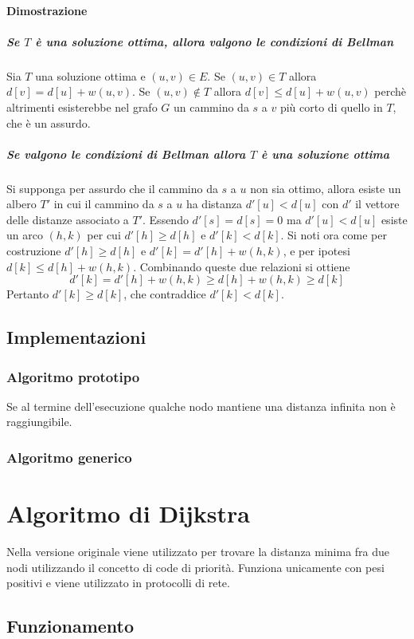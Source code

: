 	\paragraph{Dimostrazione}
	\subparagraph{Se $T$ \`e una soluzione ottima, allora valgono le condizioni di Bellman} Sia $T$ una soluzione ottima e $(u, v)\in E$. Se $(u, v)\in T$ allora $d[v]=d[u]+w(u, v)$. Se $(u,
		v)\not\in T$ allora $d[v]\le d[u]+w(u, v)$ perch\`e altrimenti esisterebbe nel grafo $G$ un cammino
	da $s$ a $v$ pi\`u corto di quello in $T$, che \`e un assurdo.
	\subparagraph{Se valgono le condizioni di Bellman allora $T$ \`e una soluzione ottima} Si supponga per assurdo che il cammino da $s$ a $u$ non sia ottimo, allora esiste un albero $T'$ in
	cui il cammino da $s$ a $u$ ha distanza $d'[u]<d[u]$ con $d'$ il vettore delle distanze associato a
	$T'$. Essendo $d'[s]=d[s]=0$ ma $d'[u]<d[u]$ esiste un arco $(h, k)$ per cui $d'[h]\ge d[h]$ e
	$d'[k]<d[k]$. Si noti ora come per costruzione $d'[h]\ge d[h]$ e $d'[k]=d'[h]+w(h, k)$, e per
	ipotesi $d[k]\le d[h]+w(h, k)$. Combinando queste due relazioni si ottiene $$ d'[k] = d'[h]+w(h,
		k)\ge d[h]+w(h, k)\ge d[k]$$ Pertanto $d'[k]\ge d[k]$, che contraddice $d'[k]<d[k]$.
	\subsection{Implementazioni}
	\subsubsection{Algoritmo prototipo}
	
	Se al termine dell'esecuzione qualche nodo mantiene una distanza infinita non \`e raggiungibile.
	\subsubsection{Algoritmo generico}
	

	
\section{Algoritmo di Dijkstra}
	Nella versione originale viene utilizzato per trovare la distanza minima fra due nodi utilizzando
	il concetto di code di priorit\`a. Funziona unicamente con pesi positivi e viene utilizzato in
	protocolli di rete.
	\subsection{Funzionamento}
